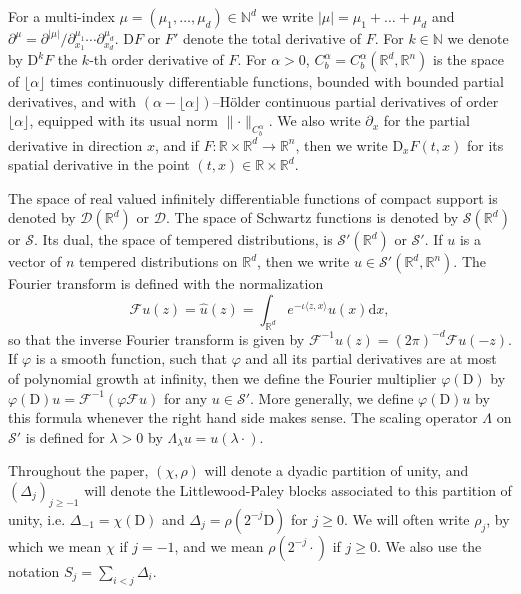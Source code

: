 \documentclass[11pt,a4paper]{article}
\newcommand{\mathD}{\mathrm{D}}
\newcommand{\mathd}{\mathrm{d}}
\theoremstyle{remark}
\newcommand{\CD}{\ensuremath{\mathscr{D}}}
\newcommand{\CF}{\ensuremath{\mathscr{F}}}
\newcommand{\CS}{\ensuremath{\mathscr{S}}}
\begin{document}
For a multi-index $\mu = ( \mu_{1} , \ldots , \mu_{d} ) \in \mathbb{N}^{d}$ we write $| \mu | = \mu_{1} + \ldots + \mu_{d}$ and $\partial^{\mu} = \partial^{| \mu |} / \partial_{x_{1}}^{\mu_{1}} \cdots \partial_{x_{d}}^{\mu_{d}}$. %
$\mathD F$ or $F'$ denote the total derivative of $F$. For $k \in \mathbb{N}$ we denote by $\mathD^{k} F$ the $k$-th order derivative of $F$. For $\alpha>0$, $C^{\alpha}_{b} =C^{\alpha}_{b} (\mathbb{R}^{d} ,\mathbb{R}^{n} )$ is the space of $\lfloor \alpha \rfloor$ times continuously differentiable functions, bounded with bounded partial derivatives, and with $(\alpha - \lfloor \alpha \rfloor)$--H\"older continuous partial derivatives of order $\lfloor \alpha \rfloor$, equipped with its usual norm $\lVert \cdot \rVert_{C^\alpha_b}$. %
We also write $\partial_{x}$ for the partial derivative in direction $x$, and if $F\colon \mathbb{R} \times\mathbb{R}^{d} \rightarrow \mathbb{R}^{n}$, then we write $\mathD_{x} F(t,x)$ for its spatial derivative in the point $( t,x ) \in \mathbb{R} \times \mathbb{R}^{d}$.

The space of real valued infinitely differentiable functions of compact support is denoted by $\CD ( \mathbb{R}^{d} )$ or $\CD$. The space of Schwartz functions is denoted by $\CS ( \mathbb{R}^{d} )$ or $\CS$. Its dual, the space of tempered distributions, is $\CS' ( \mathbb{R}^{d} )$ or $\CS'$. If $u$ is a vector of $n$ tempered distributions on $\mathbb{R}^{d}$, then we write $u \in \CS' (\mathbb{R}^{d} ,\mathbb{R}^{n} )$. The Fourier transform is defined with the normalization
\[
   \CF u ( z ) = \hat{u} ( z ) = \int_{\mathbb{R}^{d}} e^{- \iota \langle z,x \rangle} u ( x ) \mathd x,
\]
so that the inverse Fourier transform is given by $\CF^{-1} u ( z ) = ( 2 \pi)^{-d} \CF u ( -z )$. If $\varphi$ is a smooth function, such that $\varphi$ and all its partial derivatives are at most of polynomial growth at infinity, then we define the Fourier multiplier $\varphi ( \mathD )$ by $\varphi (\mathD ) u= \CF^{-1} ( \varphi \CF u)$ for any $u \in \CS'$. More generally, we define $\varphi ( \mathD ) u$ by this formula whenever the right hand side makes sense. The scaling operator $\Lambda$ on $\CS'$ is defined for $\lambda >0$ by $\Lambda_\lambda u = u(\lambda\cdot)$.

Throughout the paper, $(\chi, \rho)$ will denote a dyadic partition of unity, and $(\Delta_j)_{j \geqslant -1}$ will denote the Littlewood-Paley blocks associated to this partition of unity, i.e. $\Delta_{-1}= \chi(\mathD)$ and $\Delta_j = \rho(2^{-j} \mathD)$ for $j \geqslant 0$. We will often write $\rho_j$, by which we mean $\chi$ if $j=-1$, and we mean $\rho(2^{-j} \cdot)$ if $j \geqslant 0$. We also use the notation $S_j = \sum_{i < j} \Delta_i$.
\end{document}
